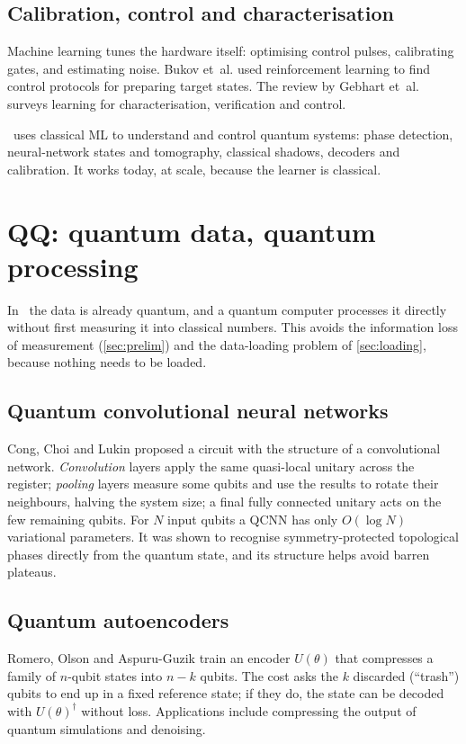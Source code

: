 \documentclass[11pt,a4paper]{article}
\begin{document}
\subsection{Calibration, control and characterisation}
Machine learning tunes the hardware itself: optimising control pulses, calibrating gates, and
estimating noise. Bukov et~al. \citeyearpar{bukov2018} used reinforcement learning to find control protocols
for preparing target states. The review by Gebhart et~al. \citeyearpar{gebhart2023} surveys learning for
characterisation, verification and control.

\begin{inshort}
\QC\ uses classical ML to understand and control quantum systems: phase detection, neural-network
states and tomography, classical shadows, decoders and calibration. It works today, at scale, because
the learner is classical.
\end{inshort}

\section{QQ: quantum data, quantum processing}
\label{sec:qq}

In \QQ\ the data is already quantum, and a quantum computer processes it directly without first
measuring it into classical numbers. This avoids the information loss of measurement
(\cref{sec:prelim}) and the data-loading problem of \cref{sec:loading}, because nothing needs to be
loaded.

\subsection{Quantum convolutional neural networks}
Cong, Choi and Lukin \citeyearpar{cong2019} proposed a circuit with the structure of a convolutional network.
\emph{Convolution} layers apply the same quasi-local unitary across the register; \emph{pooling}
layers measure some qubits and use the results to rotate their neighbours, halving the system size;
a final fully connected unitary acts on the few remaining qubits. For $N$ input qubits a QCNN has
only $O(\log N)$ variational parameters. It was shown to recognise symmetry-protected topological
phases directly from the quantum state, and its structure helps avoid barren plateaus.

\subsection{Quantum autoencoders}
Romero, Olson and Aspuru-Guzik \citeyearpar{romero2017} train an encoder $U(\theta)$ that compresses a
family of $n$-qubit states into $n-k$ qubits. The cost asks the $k$ discarded (``trash'') qubits to end
up in a fixed reference state; if they do, the state can be decoded with $U(\theta)^\dagger$ without
loss. Applications include compressing the output of quantum simulations and denoising.
\end{document}
